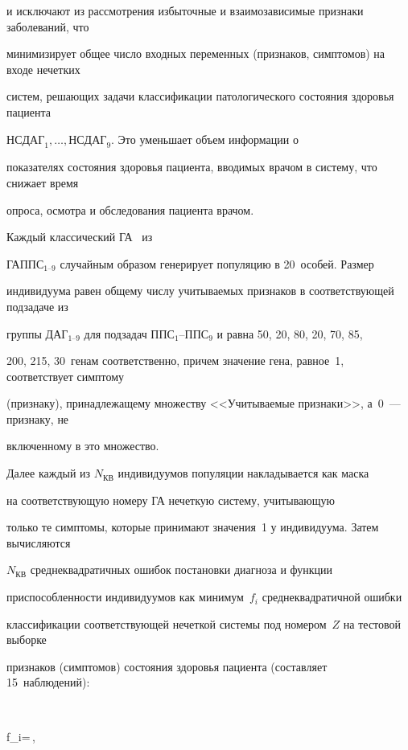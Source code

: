 и исключают из рассмотрения избыточные и взаимозависимые признаки заболеваний, что


минимизирует общее число входных переменных (признаков, симптомов) на входе нечетких


систем, решающих задачи классификации патологического состояния здоровья пациента


$\mathrm{НСДАГ}_1,\ldots , \mathrm{НСДАГ}_9$. Это уменьшает объем информации о


показателях состояния здоровья пациента, вводимых врачом в систему, что снижает время


опроса, осмотра и обследования пациента врачом.





 Каждый классический ГА~\cite{9-kir} из


 ГАППС$_{1\mbox{--}9}$ случайным образом генерирует популяцию в 20~особей. Размер


индивидуума равен общему числу учитываемых признаков в соответствующей подзадаче из


группы ДАГ$_{1\mbox{--}9}$ для подзадач ППС$_1$--ППС$_9$ и равна 50, 20, 80, 20, 70, 85,


200, 215, 30~генам соответственно, причем значение гена, равное~1, соответствует симптому


(признаку), принадлежащему множеству <<Учитываемые признаки>>, а~0~--- признаку, не


включенному в это множество.





 Далее каждый из $N_{\mathrm{КВ}}$ индивидуумов популяции накладывается как маска


на соответствующую номеру ГА нечеткую систему, учитывающую


только те симптомы, которые принимают значения~1 у индивидуума. Затем вычисляются


$N_{\mathrm{КВ}}$ среднеквадратичных ошибок постановки диагноза и функции


приспособленности индивидуумов как минимум~$f_i$ среднеквадратичной ошибки


классификации соответствующей нечеткой системы под номером~$Z$ на тестовой выборке


признаков (симптомов) состояния здоровья пациента (составляет 15~наблюдений):


$$


f_i=\,,


